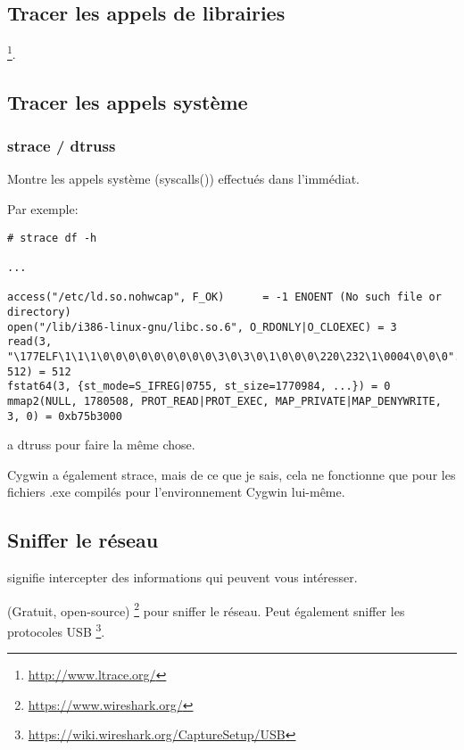 \subsection{Tracer les appels de librairies}

\footnote{\url{http://www.ltrace.org/}}.

\subsection{Tracer les appels système}

\label{strace}
\subsubsection{strace / dtruss}

Montre les appels système (syscalls()) effectués dans l'immédiat.

Par exemple:

\begin{lstlisting}
# strace df -h

...

access("/etc/ld.so.nohwcap", F_OK)      = -1 ENOENT (No such file or directory)
open("/lib/i386-linux-gnu/libc.so.6", O_RDONLY|O_CLOEXEC) = 3
read(3, "\177ELF\1\1\1\0\0\0\0\0\0\0\0\0\3\0\3\0\1\0\0\0\220\232\1\0004\0\0\0"..., 512) = 512
fstat64(3, {st_mode=S_IFREG|0755, st_size=1770984, ...}) = 0
mmap2(NULL, 1780508, PROT_READ|PROT_EXEC, MAP_PRIVATE|MAP_DENYWRITE, 3, 0) = 0xb75b3000
\end{lstlisting}

\myindex{\MacOSX}
\MacOSX a dtruss pour faire la même chose.

Cygwin a également strace, mais de ce que je sais, cela ne fonctionne que pour les fichiers .exe
compilés pour l'environnement Cygwin lui-même.

\subsection{Sniffer le réseau}

 signifie intercepter des informations qui peuvent vous intéresser.

(Gratuit, open-source) \footnote{\url{https://www.wireshark.org/}} pour sniffer le réseau.
Peut également sniffer les protocoles USB \footnote{\url{https://wiki.wireshark.org/CaptureSetup/USB}}.

